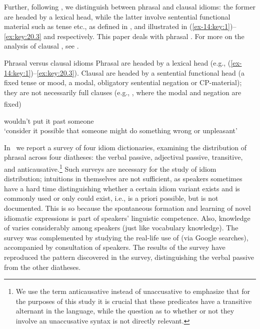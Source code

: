 \documentclass[output=paper]{langsci/langscibook}
\begin{document}
Further, following \textcite{HorSil2017,HorSil2019}, we distinguish between
phrasal and clausal idioms: the former are headed by a lexical head, while the
latter involve sentential functional material such as tense etc., as defined in
, and illustrated in (\ref{ex-14:key:1})--\eqref{ex:key:20.3} and 
respectively.  This paper deals with phrasal . For more on the
analysis of clausal , see \textcite{HorSil2019}.

\ea\label{ex:key:20.4}Phrasal versus clausal idioms
    \ea Phrasal  are headed by a lexical head (e.g., (\ref{ex-14:key:1})--\eqref{ex:key:20.3}).
    \ex Clausal  are headed by a sentential functional head (a fixed
    tense or mood, a modal, obligatory sentential negation or
    CP-material); they are not necessarily full clauses (e.g.,
    , where the modal and negation are
    fixed)\textsuperscript{}
    \z
\z

\ea\label{ex:key:20.5}
    wouldn’t put it past  someone\\
    ‘consider it possible that someone might do something wrong or unpleasant’
\z

In~ we report a survey of four  idiom dictionaries,
examining the distribution of phrasal  across four diatheses: the verbal
passive, adjectival passive, transitive, and anticausative.\footnote{We use the
    term anticausative instead of unaccusative to emphasize that for the
    purposes of this study it is crucial that these predicates have a
transitive alternant in the language, while the question as to whether or not
they involve an unaccusative syntax is not directly relevant.} Such surveys are
necessary for the study of idiom distribution; intuitions in themselves are not
sufficient, as speakers sometimes have a hard time distinguishing whether a
certain idiom variant exists and is commonly used or only could exist, i.e., is
a priori possible, but is not documented. This is so because the spontaneous
formation and learning of novel idiomatic expressions is part of speakers’
linguistic competence. Also, knowledge of  varies considerably among
speakers (just like vocabulary knowledge). The survey was complemented by
studying the real-life use of  (via Google searches), accompanied by
consultation of speakers. The results of the survey have reproduced the pattern
discovered in the  survey, distinguishing the verbal passive from
the other diatheses.
\end{document}
